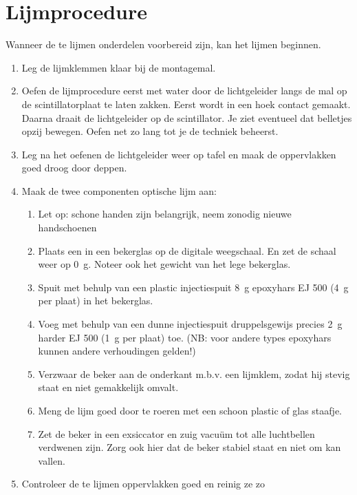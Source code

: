 \section{Lijmprocedure}

Wanneer de te lijmen onderdelen voorbereid zijn, kan het lijmen beginnen.

\begin{enumerate}
    \item Leg de lijmklemmen klaar bij de montagemal.
    \item Oefen de lijmprocedure eerst met water door de lichtgeleider
    langs de mal op de scintillatorplaat te laten zakken. Eerst wordt in een hoek
    contact gemaakt. Daarna draait de lichtgeleider op de scintillator. Je ziet
    eventueel dat belletjes opzij bewegen. Oefen net zo lang tot je de techniek
    beheerst.
    \item Leg na het oefenen de lichtgeleider weer op tafel en maak de
    oppervlakken goed droog door deppen.
    \item Maak de twee componenten optische lijm aan:
    \begin{enumerate}
        \item Let op: schone handen zijn belangrijk, neem zonodig nieuwe
        handschoenen
        \item Plaats een in een bekerglas op de digitale weegschaal.
        En zet de schaal weer op \SI{0}{\gram}. Noteer ook het gewicht
        van het lege bekerglas.
        \item Spuit met behulp van een plastic injectiespuit
        \SI{8}{\gram} epoxyhars EJ 500 (\SI{4}{\gram} per plaat) in het
        bekerglas.
        \item Voeg met behulp van een dunne injectiespuit druppelsgewijs
        precies \SI{2}{\gram} harder EJ 500 (\SI{1}{\gram} per plaat)
        toe. (NB: voor andere types epoxyhars kunnen andere verhoudingen
        gelden!)
        \item Verzwaar de beker aan de onderkant m.b.v. een lijmklem,
        zodat hij stevig staat en niet gemakkelijk omvalt.
        \item Meng de lijm goed door te roeren met een schoon plastic of
        glas staafje.
        \item Zet de beker in een exsiccator en zuig vacuüm tot alle
        luchtbellen verdwenen zijn. Zorg ook hier dat de beker stabiel
        staat en niet om kan vallen.
    \end{enumerate}
    \item Controleer de te lijmen oppervlakken goed en reinig ze zo

\end{enumerate}
